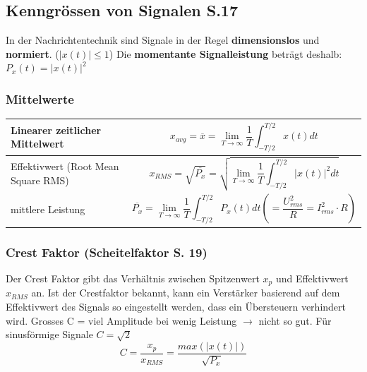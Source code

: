 \subsection{Kenngrössen von Signalen S.17}
In der Nachrichtentechnik sind Signale in der Regel \textbf{dimensionslos} und \textbf{normiert}. ($|x(t)| \leq 1$) Die \textbf{momentante Signalleistung} beträgt deshalb: $P_x(t) = |x(t)|^2$
\subsubsection{Mittelwerte}\vspace{-1em}

\begin{table}[H]
	\renewcommand{\arraystretch}{2.2}
	\begin{tabularx}{\textwidth}{X X}
		Linearer zeitlicher Mittelwert
		&
		\begin{minipage}{\linewidth}
		\begin{equation*} x_{avg}=\overline{x}=\lim\limits_{T\rightarrow\infty} \frac{1}{T} \int_{-T/2}^{T/2}x(t)dt \end{equation*}
		\end{minipage}
		\\ \hline 
		Effektivwert (Root Mean Square RMS)
		&
		\begin{minipage}{\linewidth}
		\begin{equation*} x_{RMS}=\sqrt{\overline{P_x}}=\sqrt{\lim\limits_{T\rightarrow\infty} \frac{1}{T} \int_{-T/2}^{T/2}|x(t)|^2 dt} \end{equation*}
		\end{minipage}
		\\ \hline 
		mittlere Leistung
		&
		\begin{minipage}{\linewidth}
			\begin{equation*} \overline{P_x} = \lim\limits_{T\rightarrow\infty} \frac{1}{T}\int_{-T/2}^{T/2} P_x(t)dt \left(= \frac{U_{rms}^2}{R} = I_{rms}^2 \cdot R\right)\end{equation*}
		\end{minipage}
	\end{tabularx}
\end{table}

\subsubsection{Crest Faktor (Scheitelfaktor S. 19)}
Der Crest Faktor gibt das Verhältnis zwischen Spitzenwert $x_p$ und Effektivwert $x_{RMS}$ an. Ist der Crestfaktor bekannt, kann ein Verstärker basierend auf dem Effektivwert des Signals so eingestellt werden, dass ein Übersteuern verhindert wird. Grosses C = viel Amplitude bei wenig Leistung $\rightarrow$ nicht so gut. Für sinusförmige Signale $C = \sqrt{2}$
\begin{equation*}
	C = \frac{x_p}{x_{RMS}} = \frac{max(|x(t)|)}{\sqrt{P_x}}
\end{equation*}

